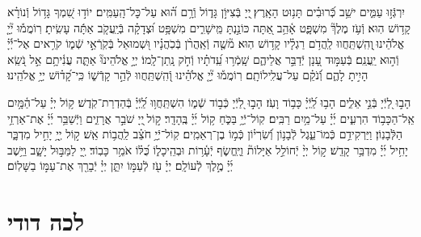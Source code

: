 \documentclass[twoside, openany, parskip=half, 11pt]{book}
\begin{document}
יִרְגְּֿז֣וּ עַמִּ֑ים ישֵׁ֥ב כְּֿ֝רוּבִ֗ים תָּנ֥וּט הָאָֽרֶץ׃
֖יְיָ בְּֿצִיּוֹ֣ן גָּד֑וֹל וְֿרָ֥ם ה֝֗וּא עַל־כׇּל־הָֽעַמִּֽים׃
יוֹד֣וּ שִׁ֭מְךָ גָּד֥וֹל וְֿנוֹרָ֗א קָד֥וֹשׁ הֽוּא׃
וְֿעֹ֥ז מֶלֶךְ֘ מִשְׁפָּ֢ט אָ֫הֵ֥ב אַ֭תָּה כּוֹנַ֣נְתָּ מֵּֽישָׁרִ֑ים מִשְׁפָּ֥ט וּ֝צְדָקָ֗ה בְּֿיַֽעֲקֹ֤ב אַתָּ֬ה עָשִֽׂיתָ׃
רֽוֹמֲמ֡וּ יְ֘יָ֤ אֱלֹהֵ֗ינוּ ֖וְהִֽשְׁתַּֽחֲווּ לַֽהֲדֹ֥ם רַגְלָ֗יו קָד֥וֹשׁ הֽוּא׃
מ֘שֶׁ֤ה וְֿאַֽהֲרֹ֨ן בְּֿכֹֽהֲנָ֗יו וּ֭שְׁמוּאֵל בְּֿקֹֽרְֿאֵ֣י שְֿׁמ֑וֹ קֹרִ֥אים אֶל־יְֿ֜יָ֗ וְֿה֣וּא יַֽעֲנֵֽם׃
בְּֿעַמּ֣וּד עָ֭נָן יְֿדַבֵּ֣ר אֲלֵיהֶ֑ם שָֽׁמְֿר֥וּ עֵֽ֝דֹתָ֗יו וְֿחֹ֣ק נָֽתַן־לָֽמוֹ׃
יְיָ֣ אֱלֹהֵינוּ֘ אַתָּ֢ה עֲנִ֫יתָ֥ם אֵ֣ל נֹ֭שֵֽׂא הָיִ֣יתָ לָהֶ֑ם וְֿ֝נֹקֵ֗ם עַל־עֲלִֽילוֹתָֽם׃
רֽוֹמֲמ֡וּ יְ֘יָ֤ אֱלֹהֵ֗ינוּ וְֿ֭הִֽשְׁתַּֽחֲווּ לְֿהַ֣ר קָדְֿשׁ֑וֹ כִּֽי־קָ֝ד֗וֹשׁ יְיָ֥ אֱלֹהֵֽינוּ׃

הָב֣וּ לַ֭יְֿיָ בְּֿנֵ֣י אֵלִ֑ים הָב֥וּ לַֽ֝יְֿיָ֗ כָּב֥וֹד וָעֹֽז׃
הָב֣וּ לַ֭יְֿיָ כְּֿב֣וֹד שְֿׁמ֑וֹ הִשְׁתַּֽחֲו֥וּ לַֽ֝יְֿיָ֗ בְּֿהַדְרַת־קֹֽדֶשׁ׃
ק֥וֹל יְיָ֗ עַל־הַ֫מָּ֥יִם אֵֽל־הַכָּב֥וֹד הִרְעִ֑ים יְ֜יָ֗ עַל־מַ֥יִם רַבִּֽים׃
קֽוֹל־יְֿיָ֥ בַּכֹּ֑חַ ק֥וֹל יְ֜יָ֗ בֶּֽהָדָֽר׃
ק֣וֹל ֖יְיָ שֹׁבֵ֣ר אֲרָזִ֑ים וַיְֿשַׁבֵּ֥ר יְ֜יָ֗ אֶת־אַרְזֵ֥י הַלְּֿבָנֽוֹן׃
וַיַּרְקִידֵ֥ם כְּֿמוֹ־עֵ֑גֶל לְֿבָנ֥וֹן וְֿ֝שִׂרְי֗וֹן כְּֿמ֣וֹ בֶן־רְאֵמִֽים׃
קֽוֹל־יְֿיָ֥ חֹצֵ֗ב לַֽהֲב֥וֹת אֵֽשׁ׃
ק֣וֹל יְ֖יָ֥ יָחִ֣יל מִדְבָּ֑ר יָחִ֥יל יְ֜יָ֗ מִדְבַּ֥ר קָדֵֽשׁ׃
ק֣וֹל יְיָ֨ יְֿחוֹלֵ֣ל אַיָּלוֹת֘ וַיֶּֽחֱשׂ֢ף יְֿעָ֫ר֥וֹת וּבְהֵֽיכָל֑וֹ כֻּ֝לּ֗וֹ אֹמֵ֥ר כָּבֽוֹד׃
יְ֖יָ לַמַּבּ֣וּל יָשָׁ֑ב וַיֵּ֥שֶׁב יְ֜יָ֗ מֶ֣לֶךְ לְֿעוֹלָֽם׃
יְיָ֗ עֹ֖ז לְֿעַמּ֣וֹ יִתֵּ֑ן יְיָ֓ יְֿבָרֵ֖ךְ אֶת־עַמּ֣וֹ בַשָּׁלֽוֹם׃


\section*{ לכה דודי }

\newcommand{\lechadodi}{\textbf{לְכָה דוֹדִי לִקְרַאת כַּלָּה פְּֿנֵי שַׁבָּת נְֿקַבְּֿלָה:}}
\end{document}
